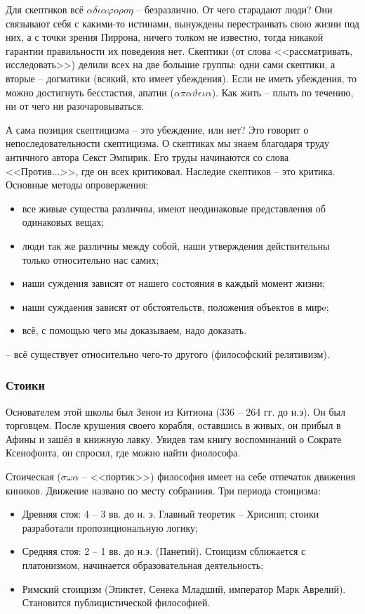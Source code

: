 \documentclass[a4paper, 12pt]{book} %
\begin{document}
Для скептиков всё $\alpha \delta \iota \alpha \varphi o \rho o \eta$ -- безразлично. От чего старадают люди? Они связывают себя с какими-то истинами, вынуждены перестраивать свою жизни под  них, а с точки зрения Пиррона, ничего толком не известно, тогда никакой гарантии правильности их поведения нет. Скептики (от слова <<рассматривать, исследовать>>) делили всех на две большие группы: одни сами скептики, а вторые -- догматики (всякий, кто имеет убеждения). Если не иметь убеждения, то можно достигнуть бесстастия, апатии ($\alpha \pi \alpha \vartheta \epsilon \iota \alpha$). Как жить -- плыть по течению, ни от чего ни разочаровываться. 

А сама позиция скептицизма -- это убеждение, или нет? Это говорит о непоследовательности скептицизма. О скептиках мы знаем благодаря труду античного автора Секст Эмпирик. Его труды начинаются со слова <<Против...>>, где он всех критиковал. Наследие скептиков -- это критика. Основные методы опровержения:
\begin{itemize}
\item  все живые существа различны, имеют неодинаковые представления об одинаковых вещах;
\item люди так же различны между собой, наши утверждения действительны только относительно нас самих;
\item наши суждения зависят от нашего состояния в каждый момент жизни;
\item наши суждаения зависят от обстоятельств, положения объектов в мирe;
\item всё, с помощью чего мы доказываем, надо доказать.
\end{itemize}
-- всё существует относительно чего-то другого (философский релятивизм).

\subsubsection{Стоики}
Основателем этой школы был Зенон из Китиона (336 -- 264 гг. до н.э). Он был торговцем. После крушения своего корабля, оставшись в живых, он прибыл в Афины и зашёл в книжную лавку. Увидев там книгу воспоминаний о Сократе Ксенофонта, он спросил, где можно найти фиолософа.

Стоическая ($\sigma\omega\alpha$ -- <<портик>>) философия имеет на себе отпечаток движения киников. Движение названо по месту собраниия.
Три периода стоицизма:
\begin{itemize}
\item Древняя стоя: 4 -- 3 вв. до н. э. Главный теоретик -- Хрисипп; стоики разработали пропозициональную логику;
\item  Средняя стоя: 2 -- 1 вв. до н.э. (Панетий). Стоицизм сближается с платонизмом, начинается образовательная деятельность;
\item Римский стоицизм (Эпиктет, Сенека Младший, император Марк Аврелий). Становится публицистической философией.
\end{itemize}
\end{document}
